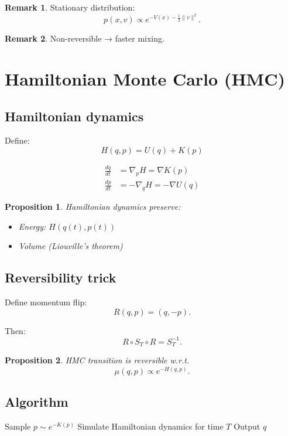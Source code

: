 \documentclass[12pt,oneside]{book}
\numberwithin{equation}{section}
\theoremstyle{definition}
\newtheorem{remark}{Remark}[section]
\theoremstyle{plain}
\newtheorem{proposition}{Proposition}[section]
\theoremstyle{remark}
\begin{document}
\begin{remark}
Stationary distribution:
\[
p(x,v) \propto e^{-V(x) - \frac{1}{2}\|v\|^2}.
\]
\end{remark}

\begin{remark}
Non-reversible → faster mixing.
\end{remark}


\section*{Hamiltonian Monte Carlo (HMC)}

\subsection*{Hamiltonian dynamics}

Define:
\[
H(q,p) = U(q) + K(p)
\]

\[
\begin{aligned}
\frac{dq}{dt} &= \nabla_p H = \nabla K(p) \\
\frac{dp}{dt} &= -\nabla_q H = -\nabla U(q)
\end{aligned}
\]

\begin{proposition}
Hamiltonian dynamics preserve:
\begin{itemize}
\item Energy: $H(q(t),p(t))$
\item Volume (Liouville's theorem)
\end{itemize}
\end{proposition}


\subsection*{Reversibility trick}

Define momentum flip:
\[
R(q,p) = (q,-p).
\]

Then:
\[
R \circ S_T \circ R = S_T^{-1}.
\]

\begin{proposition}
HMC transition is reversible w.r.t.
\[
\mu(q,p) \propto e^{-H(q,p)}.
\]
\end{proposition}


\subsection*{Algorithm}

\begin{algorithm}
\caption{Hamiltonian Monte Carlo (idealized)}
\begin{algorithmic}
\State Sample $p \sim e^{-K(p)}$
\State Simulate Hamiltonian dynamics for time $T$
\State Output $q$
\end{algorithmic}
\end{algorithm}
\end{document}
